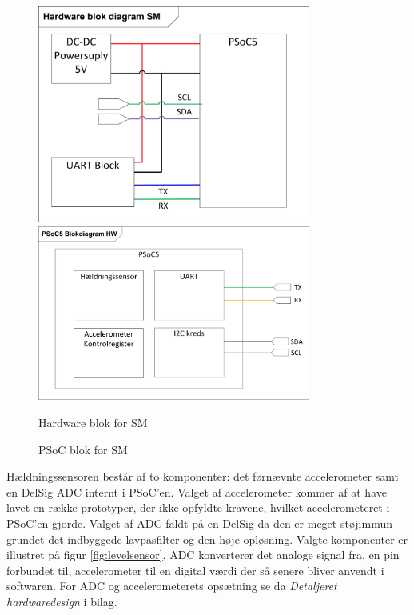 \begin{figure}[H]
	\centering
	\begin{minipage}[b]{0.48\textwidth}\centering
	\includegraphics[width=0.80\textwidth]{billeder/SMHardware}
	\end{minipage}
	\begin{minipage}[b]{0.48\textwidth}\centering
	\includegraphics[width=0.80\textwidth]{billeder/SMPSoCblock}
	\end{minipage}
	\begin{minipage}[t]{0.48\textwidth}
	\caption{Hardware blok for SM}
	\label{fig:SMHW1}
	\end{minipage}
	\begin{minipage}[t]{0.48\textwidth}
	\caption{PSoC blok for SM}
	\label{fig:SMPSOC1}
	\end{minipage}
\end{figure}
Hældningssensoren består af to komponenter: det førnævnte accelerometer samt en DelSig ADC internt i PSoC'en. Valget af accelerometer kommer af at have lavet en række prototyper, der ikke opfyldte kravene, hvilket accelerometeret i PSoC'en gjorde. Valget af ADC faldt på en DelSig da den er meget støjimmun grundet det indbyggede lavpasfilter og den høje opløsning. Valgte komponenter er illustret på figur \ref{fig:levelsensor}. ADC konverterer det analoge signal fra, en pin forbundet til, accelerometer til en digital værdi der så senere bliver anvendt i softwaren. For ADC og accelerometerets opsætning se da \textit{Detaljeret hardwaredesign} i bilag.
